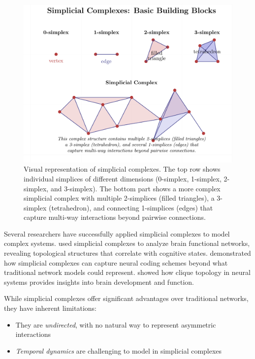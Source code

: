 \begin{figure}[htbp]
    \centering
    \includegraphics[width=\textwidth]{figures/simplicial_complexes-1.png}
    \caption{Visual representation of simplicial complexes. The top row shows individual simplices of different dimensions (0-simplex, 1-simplex, 2-simplex, and 3-simplex). The bottom part shows a more complex simplicial complex with multiple 2-simplices (filled triangles), a 3-simplex (tetrahedron), and connecting 1-simplices (edges) that capture multi-way interactions beyond pairwise connections.}
    \label{fig:simplicial_complexes}
\end{figure}

Several researchers have successfully applied simplicial complexes to model complex systems. \citet{petri2014homological} used simplicial complexes to analyze brain functional networks, revealing topological structures that correlate with cognitive states. \citet{giusti2016two} demonstrated how simplicial complexes can capture neural coding schemes beyond what traditional network models could represent. \citet{sizemore2018importance} showed how clique topology in neural systems provides insights into brain development and function.

While simplicial complexes offer significant advantages over traditional networks, they have inherent limitations:
\begin{itemize}
    \item They are \textit{undirected}, with no natural way to represent asymmetric interactions
    \item \textit{Temporal dynamics} are challenging to model in simplicial complexes
\end{itemize}

